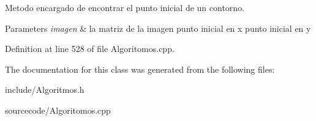 Metodo encargado de encontrar el punto inicial de un contorno. 


\begin{DoxyParams}{Parameters}
{\em imagen} & la matriz de la imagen  punto inicial en x  punto inicial en y \\
\hline
\end{DoxyParams}


Definition at line 528 of file Algoritomos.\+cpp.



The documentation for this class was generated from the following files\+:\begin{DoxyCompactItemize}
\item 
include/Algoritmos.\+h\item 
sourcecode/Algoritomos.\+cpp\end{DoxyCompactItemize}
